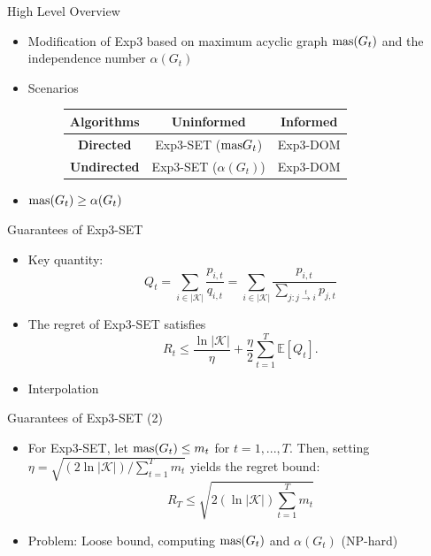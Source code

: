 \documentclass{beamer}
\newcommand{\mas}{\text{\normalfont mas}}
\begin{document}
\begin{frame}{High Level Overview}
  \begin{itemize}
    \item Modification of Exp3 based on maximum acyclic graph $\mas(G_t)$ and the independence number $\alpha(G_t)$
    \item Scenarios
      \begin{figure}[]
      \center
      \begin{tabular}{ | c | c | c | }
          \hline
          \textbf{Algorithms} & \textbf{Uninformed} & \textbf{Informed} \\
          \hline
          \textbf{Directed} & Exp3-SET ($\mas{G_t}$) & Exp3-DOM\\
          \hline
          \textbf{Undirected} & Exp3-SET ($\alpha(G_t)$) & Exp3-DOM\\
          \hline
      \end{tabular}
      \end{figure}
    \item $\mas(G_t) \geq \alpha(G_t)$
  \end{itemize}
\end{frame} 

\begin{frame}{Guarantees of Exp3-SET}
  \begin{itemize}
    \item Key quantity: $$Q_t=\sum_{i\in |\mathcal{K}|}\frac{p_{i,t}}{q_{i,t}} = \sum_{i\in |\mathcal{K}|}\frac{p_{i,t}}{\sum_{j:j\overset{t}{\to}i} p_{j,t}}$$

    \item The regret of Exp3-SET satisfies
    $$
    R_t\leq \frac{\ln |\mathcal{K}|}{\eta} + \frac{\eta}{2}\sum_{t=1}^T\mathbb{E}[Q_t].
    $$
   
    \item Interpolation

 \end{itemize}
\end{frame}

\begin{frame}{Guarantees of Exp3-SET (2)}
\begin{itemize}
    \item For Exp3-SET, let $\mas(G_t)\leq m_t$ for $t=1,...,T$. Then, setting $\eta=\sqrt{(2\ln |\mathcal{K}|)/\sum_{t=1}^T m_t}$ yields the regret bound: $$R_T\leq \sqrt{2(\ln |\mathcal{K}|)\sum_{t=1}^Tm_t}$$

     \item Problem: Loose bound, computing $\mas(G_t)$ and $\alpha(G_t)$ (NP-hard) 
\end{itemize}
\end{frame}
\end{document}
